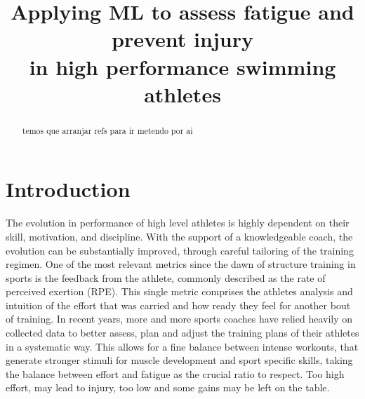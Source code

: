 \documentclass[conference]{IEEEtran}
\begin{document}
\title{Applying ML to assess fatigue and prevent injury\\in high performance swimming athletes}

\author{
\and
{}
}


\maketitle
\thispagestyle{plain}

\begin{abstract}
temos que arranjar refs para ir metendo por ai
\end{abstract}


\IEEEpeerreviewmaketitle


\section{Introduction}
The evolution in performance of high level athletes is highly dependent on their skill, motivation, and discipline. With the support of a knowledgeable coach, the evolution can be substantially improved, through careful tailoring of the training regimen. One of the most relevant metrics since the dawn of structure training in sports is the feedback from the athlete, commonly described as the rate of perceived exertion (RPE). This single metric comprises the athletes analysis and intuition of the effort that was carried and how ready they feel for another bout of training. In recent years, more and more sports coaches have relied heavily on collected data to better assess, plan and adjust the training plans of their athletes in a systematic way. This allows for a fine balance between intense workouts, that generate stronger stimuli for muscle development and sport specific skills, taking the balance between effort and fatigue as the crucial ratio to respect. Too high effort, may lead to injury, too low and some gains may be left on the table. 
\end{document}

